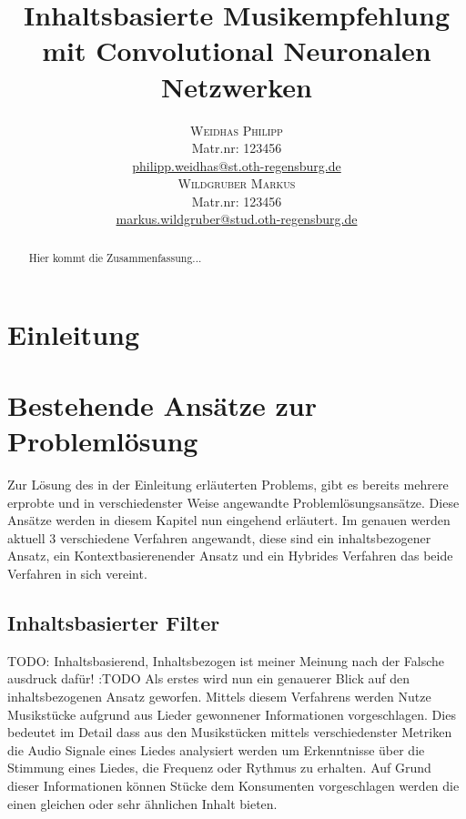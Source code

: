 \documentclass[twosided,a4,10pt]{article}
\title{\vspace{-5mm}%
	\fontsize{20pt}{10pt}\selectfont
	\textbf{Inhaltsbasierte Musikempfehlung mit Convolutional Neuronalen Netzwerken}
	}
\author{
	\large
       \begin{minipage}[t]{0.5\linewidth}
         \begin{center}
           	\textsc{Weidhas Philipp}\\[2mm]
                 \normalsize	Matr.nr: 123456\\
                 \normalsize
                 \href{mailto:philipp.weidhas@st.oth-regensburg.de}
                 {philipp.weidhas@st.oth-regensburg.de}      
         \end{center}
       \end{minipage}        
       \begin{minipage}[t]{0.5\linewidth}
         \begin{center}
           	\textsc{Wildgruber Markus}\\[2mm]
                 \normalsize	Matr.nr: 123456\\
                 \normalsize
                 \href{mailto:markus.wildgruber@stud.oth-regensburg.de}
                 {markus.wildgruber@stud.oth-regensburg.de}      
         \end{center}
       \end{minipage}
     }
\begin{document}
\maketitle
\thispagestyle{fancy}

	

\begin{multicols}{2}

\begin{abstract}
\noindent Hier kommt die Zusammenfassung...
\end{abstract}


\section{Einleitung}

\section{Bestehende Ansätze zur Problemlösung}
Zur Lösung des in der Einleitung erläuterten Problems, gibt es bereits mehrere erprobte und in verschiedenster Weise angewandte Problemlösungsansätze. Diese Ansätze werden in diesem Kapitel nun eingehend erläutert. Im genauen werden aktuell 3 verschiedene Verfahren angewandt, diese sind ein inhaltsbezogener Ansatz, ein Kontextbasierenender Ansatz und ein Hybrides Verfahren das beide Verfahren in sich vereint.
\subsection{Inhaltsbasierter Filter}
TODO: Inhaltsbasierend, Inhaltsbezogen ist meiner Meinung nach der Falsche ausdruck dafür! :TODO
Als erstes wird nun ein genauerer Blick auf den inhaltsbezogenen Ansatz geworfen. Mittels diesem Verfahrens werden Nutze Musikstücke aufgrund aus Lieder gewonnener Informationen vorgeschlagen. Dies bedeutet im Detail dass aus den Musikstücken mittels verschiedenster Metriken die Audio Signale eines Liedes analysiert werden um Erkenntnisse über die Stimmung eines Liedes, die Frequenz oder Rythmus zu erhalten. Auf Grund dieser Informationen können Stücke dem Konsumenten vorgeschlagen werden die einen gleichen oder sehr ähnlichen Inhalt bieten.

\end{multicols}
\end{document}
